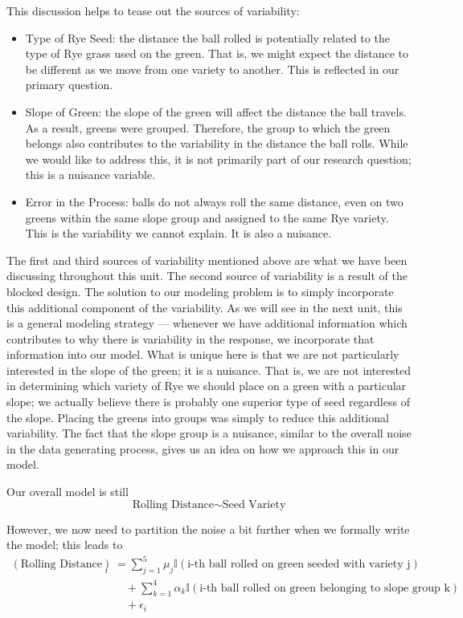 \documentclass[]{book}
\providecommand{\tightlist}{%
  \setlength{\itemsep}{0pt}\setlength{\parskip}{0pt}}
\theoremstyle{definition}
\theoremstyle{definition}
\theoremstyle{remark}
\begin{document}
This discussion helps to tease out the sources of variability:

\begin{itemize}
\tightlist
\item
  Type of Rye Seed: the distance the ball rolled is potentially related
  to the type of Rye grass used on the green. That is, we might expect
  the distance to be different as we move from one variety to another.
  This is reflected in our primary question.
\item
  Slope of Green: the slope of the green will affect the distance the
  ball travels. As a result, greens were grouped. Therefore, the group
  to which the green belongs also contributes to the variability in the
  distance the ball rolls. While we would like to address this, it is
  not primarily part of our research question; this is a nuisance
  variable.
\item
  Error in the Process: balls do not always roll the same distance, even
  on two greens within the same slope group and assigned to the same Rye
  variety. This is the variability we cannot explain. It is also a
  nuisance.
\end{itemize}

The first and third sources of variability mentioned above are what we
have been discussing throughout this unit. The second source of
variability is a result of the blocked design. The solution to our
modeling problem is to simply incorporate this additional component of
the variability. As we will see in the next unit, this is a general
modeling strategy --- whenever we have additional information which
contributes to why there is variability in the response, we incorporate
that information into our model. What is unique here is that we are not
particularly interested in the slope of the green; it is a nuisance.
That is, we are not interested in determining which variety of Rye we
should place on a green with a particular slope; we actually believe
there is probably one superior type of seed regardless of the slope.
Placing the greens into groups was simply to reduce this additional
variability. The fact that the slope group is a nuisance, similar to the
overall noise in the data generating process, gives us an idea on how we
approach this in our model.

Our overall model is still
\[\text{Rolling Distance} \sim \text{Seed Variety}\]

However, we now need to partition the noise a bit further when we
formally write the model; this leads to \[
\begin{aligned}
  (\text{Rolling Distance})_i &= \sum_{j=1}^{5} \mu_j \mathbb{I}(\text{i-th ball rolled on green seeded with variety j}) \\
    &\quad + \sum_{k=1}^{4} \alpha_k\mathbb{I}(\text{i-th ball rolled on green belonging to slope group k}) \\
    &\quad + \epsilon_i
\end{aligned}
\]
\end{document}
